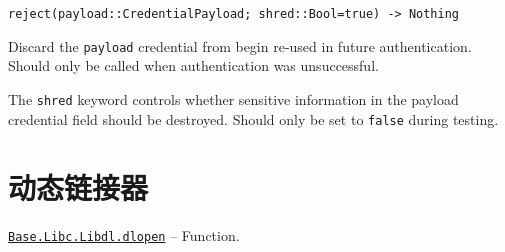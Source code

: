 \begin{adjustwidth}{2em}{0pt}


\begin{verbatim}
reject(payload::CredentialPayload; shred::Bool=true) -> Nothing
\end{verbatim}

Discard the \texttt{payload} credential from begin re-used in future authentication. Should only be called when authentication was unsuccessful.

The \texttt{shred} keyword controls whether sensitive information in the payload credential field should be destroyed. Should only be set to \texttt{false} during testing.



\end{adjustwidth}

\hypertarget{13528239852401045842}{}


\chapter{动态链接器}


\hypertarget{13488184288681759423}{}
\hyperlink{13488184288681759423}{\texttt{Base.Libc.Libdl.dlopen}}  -- {Function.}

